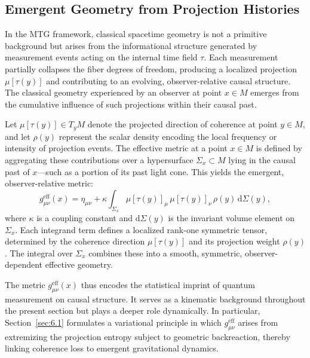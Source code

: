 \documentclass[11pt]{article}
\begin{document}
\subsection{Emergent Geometry from Projection Histories}\label{sec:2.9}

In the MTG framework, classical spacetime geometry is not a primitive background but arises from the informational structure generated by measurement events acting on the internal time field \( \tau \). Each measurement partially collapses the fiber degrees of freedom, producing a localized projection \( \mu[\tau(y)] \) and contributing to an evolving, observer-relative causal structure. The classical geometry experienced by an observer at point \( x \in M \) emerges from the cumulative influence of such projections within their causal past.

Let \( \mu[\tau(y)] \in T_y M \) denote the projected direction of coherence at point \( y \in M \), and let \( \rho(y) \) represent the scalar density encoding the local frequency or intensity of projection events. The effective metric at a point \( x \in M \) is defined by aggregating these contributions over a hypersurface \( \Sigma_x \subset M \) lying in the causal past of \( x \)—such as a portion of its past light cone. This yields the emergent, observer-relative metric:
\begin{equation}
g^{\mathrm{eff}}_{\mu\nu}(x) = \eta_{\mu\nu} + \kappa \int_{\Sigma_x} \mu[\tau(y)]_\mu \, \mu[\tau(y)]_\nu \, \rho(y) \, \mathrm{d}\Sigma(y),
\end{equation}
where \( \kappa \) is a coupling constant and \( \mathrm{d}\Sigma(y) \) is the invariant volume element on \( \Sigma_x \). Each integrand term defines a localized rank-one symmetric tensor, determined by the coherence direction \( \mu[\tau(y)] \) and its projection weight \( \rho(y) \). The integral over \( \Sigma_x \) combines these into a smooth, symmetric, observer-dependent effective geometry.

The metric \( g^{\mathrm{eff}}_{\mu\nu}(x) \) thus encodes the statistical imprint of quantum measurement on causal structure. It serves as a kinematic background throughout the present section but plays a deeper role dynamically. In particular, Section~\ref{sec:6.1} formulates a variational principle in which \( g^{\mathrm{eff}}_{\mu\nu} \) arises from extremizing the projection entropy subject to geometric backreaction, thereby linking coherence loss to emergent gravitational dynamics.
\end{document}
